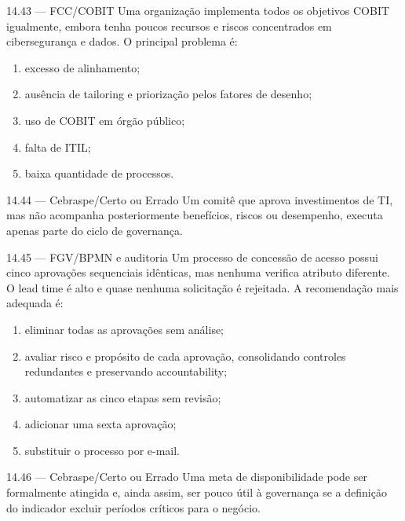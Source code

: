 \begin{questao}{ 14.43 — FCC/COBIT}
Uma organização implementa todos os objetivos COBIT igualmente, embora tenha poucos recursos e riscos concentrados em cibersegurança e dados. O principal problema é:
\begin{enumerate}[label=\Alph*)]
\item excesso de alinhamento;
\item ausência de tailoring e priorização pelos fatores de desenho;
\item uso de COBIT em órgão público;
\item falta de ITIL;
\item baixa quantidade de processos.
\end{enumerate}
\end{questao}

\begin{questao}{ 14.44 — Cebraspe/Certo ou Errado}
Um comitê que aprova investimentos de TI, mas não acompanha posteriormente benefícios, riscos ou desempenho, executa apenas parte do ciclo de governança.
\end{questao}

\begin{questao}{ 14.45 — FGV/BPMN e auditoria}
Um processo de concessão de acesso possui cinco aprovações sequenciais idênticas, mas nenhuma verifica atributo diferente. O lead time é alto e quase nenhuma solicitação é rejeitada. A recomendação mais adequada é:
\begin{enumerate}[label=\Alph*)]
\item eliminar todas as aprovações sem análise;
\item avaliar risco e propósito de cada aprovação, consolidando controles redundantes e preservando accountability;
\item automatizar as cinco etapas sem revisão;
\item adicionar uma sexta aprovação;
\item substituir o processo por e-mail.
\end{enumerate}
\end{questao}

\begin{questao}{ 14.46 — Cebraspe/Certo ou Errado}
Uma meta de disponibilidade pode ser formalmente atingida e, ainda assim, ser pouco útil à governança se a definição do indicador excluir períodos críticos para o negócio.
\end{questao}

